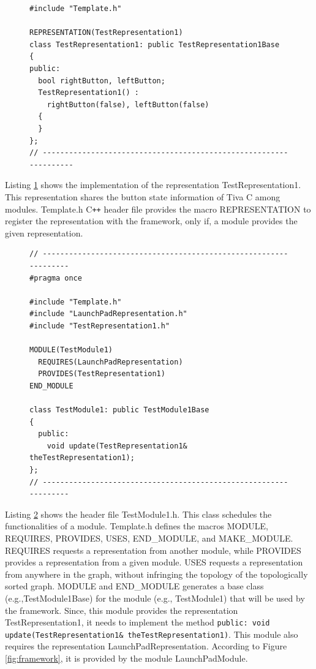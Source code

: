 \documentclass{llncs}
\begin{document}
\begin{sloppy}
\begin{figure}[!ht]
\begin{center}
\begin{verbatim}
#include "Template.h"

REPRESENTATION(TestRepresentation1)
class TestRepresentation1: public TestRepresentation1Base
{
public:
  bool rightButton, leftButton;
  TestRepresentation1() :
    rightButton(false), leftButton(false)
  {
  }
};
// ------------------------------------------------------------------
\end{verbatim}
\end{center}
\label{list:TestRepresentation1.h}
\end{figure}

Listing \ref{list:TestRepresentation1.h} shows the implementation of the representation {\sf
TestRepresentation1}. This representation shares the button state information of Tiva C among
modules. {\sf Template.h} C\texttt{++} header file provides the macro {\sf REPRESENTATION} to
register the representation with the framework, only if, a module provides the given
representation. 

\begin{figure}[!ht]
\begin{center}
\begin{verbatim}
// -----------------------------------------------------------------
#pragma once

#include "Template.h"
#include "LaunchPadRepresentation.h"
#include "TestRepresentation1.h"

MODULE(TestModule1)
  REQUIRES(LaunchPadRepresentation)
  PROVIDES(TestRepresentation1)
END_MODULE

class TestModule1: public TestModule1Base
{
  public:
    void update(TestRepresentation1& theTestRepresentation1);
}; 
// -----------------------------------------------------------------
\end{verbatim}
\end{center}
\label{list:TestModule1.h}
\end{figure}

Listing \ref{list:TestModule1.h} shows the header file {\sf TestModule1.h}. This class schedules
the functionalities of a module. {\sf Template.h} defines the macros {\sf MODULE}, {\sf REQUIRES},
{\sf PROVIDES}, {\sf USES}, {\sf END\_MODULE}, and {\sf MAKE\_MODULE}.  {\sf REQUIRES} requests a
representation from another module, while {\sf PROVIDES} provides a representation from a given
module. {\sf USES} requests a representation from anywhere in the graph, without infringing the
topology of the topologically sorted graph. {\sf MODULE} and {\sf END\_MODULE} generates a base
class (e.g.,{\sf TestModule1Base}) for the module (e.g., {\sf TestModule1}) that will be used by the
framework. Since, this module provides the representation {\sf TestRepresentation1}, it needs to
implement the method \texttt{public: void update(TestRepresentation1&
theTestRepresentation1)}. This module also requires the representation {\sf
LaunchPadRepresentation}. According to Figure \ref{fig:framework}, it is provided by the module
{\sf LaunchPadModule}. 



\end{sloppy}
\end{document}
